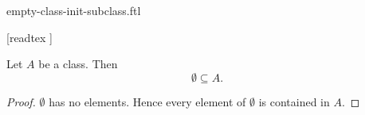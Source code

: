 \documentclass{stex}
\begin{document}
\begin{smodule}{empty-class-init-subclass.ftl}

  \begin{forthel}

    [readtex ]
  \end{forthel}

  \begin{forthel}
    \begin{proposition}
      Let $A$ be a class.
      Then \[ \emptyset \subseteq A. \]
    \end{proposition}
    \begin{proof}
      $\emptyset$ has no elements.
      Hence every element of $\emptyset$ is contained in $A$.
    \end{proof}
  \end{forthel}
\end{smodule}
\end{document}
